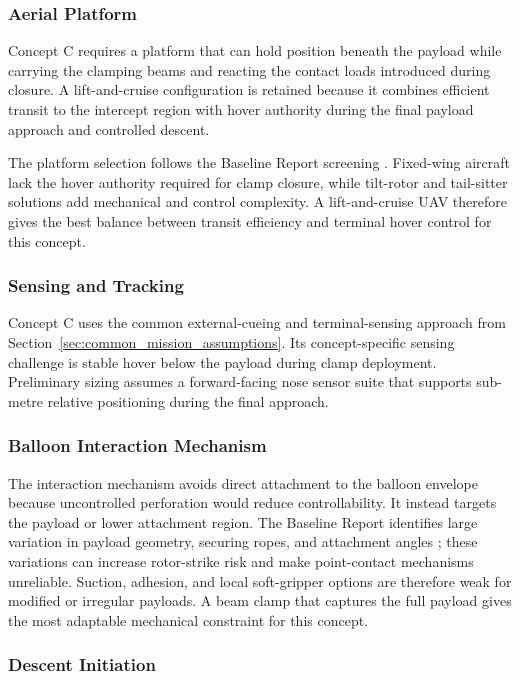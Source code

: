 \subsubsection{Aerial Platform}
Concept C requires a platform that can hold position beneath the payload while carrying the clamping beams and reacting the contact loads introduced during closure. A lift-and-cruise configuration is retained because it combines efficient transit to the intercept region with hover authority during the final payload approach and controlled descent.

The platform selection follows the Baseline Report screening
\cite{Group222026DSEReport}. Fixed-wing aircraft lack the hover
authority required for clamp closure, while tilt-rotor and tail-sitter
solutions add mechanical and control complexity. A lift-and-cruise UAV
therefore gives the best balance between transit efficiency and terminal
hover control for this concept.
\subsubsection{Sensing and Tracking}
Concept C uses the common external-cueing and terminal-sensing approach
from Section~\ref{sec:common_mission_assumptions}. Its concept-specific
sensing challenge is stable hover below the payload during clamp
deployment. Preliminary sizing assumes a forward-facing nose sensor
suite that supports sub-metre relative positioning during the final
approach.


\subsubsection{Balloon Interaction Mechanism}
The interaction mechanism avoids direct attachment to the balloon
envelope because uncontrolled perforation would reduce controllability.
It instead targets the payload or lower attachment region. The Baseline
Report identifies large variation in payload geometry, securing ropes,
and attachment angles \cite{Group222026DSEReport}; these variations can
increase rotor-strike risk and make point-contact mechanisms unreliable.
Suction, adhesion, and local soft-gripper options are therefore weak for
modified or irregular payloads. A beam clamp that captures the full
payload gives the most adaptable mechanical constraint for this concept.





\subsubsection{Descent Initiation}

